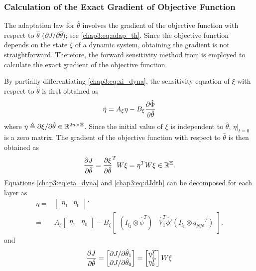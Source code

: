 \subsubsection{Calculation of the Exact Gradient of Objective Function}

The adaptation law for $\hat\theta$ involves the gradient of the objective function with respect to $\hat\theta$ (\ie ${\partial J/\partial \hat\theta}$); see \eqref{chap3:eq:adap_th}. Since the objective function depends on the state $\xi$ of a dynamic system, obtaining the gradient is not straightforward. Therefore, the forward sensitivity method from \cite{RN49} is employed to calculate the exact gradient of the objective function. 

By partially differentiating \eqref{chap3:eq:xi_dyna}, the sensitivity equation of $\xi$ with respect to $\hat\theta$ is first obtained as
\begin{equation}
    \dot\eta = A_\xi\eta - B_\xi{\partial\hat\Phi\over\partial\hat\theta}
    \label{chap3:eq:eta_dyna}
\end{equation}
where $\eta \triangleq \partial \xi/\partial \hat\theta\in\mathbb{R}^{2n\times \Xi}$.
Since the initial value of $\xi$ is independent to $\hat\theta$, $\eta\vert_{t=0}$ is a zero matrix. 
The gradient of the objective function with respect to $\hat\theta$ is then obtained as 
\begin{equation}
   {\partial J\over\partial \hat\theta} =  {\partial \xi\over \partial \hat\theta}^T  W\xi=\eta^T  W\xi\in\mathbb{R}^\Xi.
   \label{chap3:eq:dJdth}
\end{equation}
Equations \eqref{chap3:eq:eta_dyna} and \eqref{chap3:eq:dJdth} can be decomposed for each layer as 
\begin{equation}
  \begin{aligned}
    \dot\eta =&
    \begin{bmatrix}
        \eta_1&\eta_0
    \end{bmatrix}'
    \\
    =&A_\xi
    \begin{bmatrix}
        \eta_1&\eta_0
    \end{bmatrix}
    -B_\xi
    \begin{bmatrix}
        (I_{l_2}\otimes \hat\phi^T)&\hat V_1^T\hat\phi'(I_{l_1}\otimes {q_{NN}}^T)
    \end{bmatrix}
    .
  \end{aligned}
  \label{chap3:eq:eta_dyna_decomp}
\end{equation}
and
\begin{equation}
    {\partial J\over\partial\hat\theta}
    =
    \begin{bmatrix}
        \partial J/\partial\hat\theta_1\\\partial J/\partial\hat\theta_0\\
    \end{bmatrix}    =
    \begin{bmatrix}
        \eta_1^T\\\eta_0^T\\
    \end{bmatrix}
    W
    \xi
\end{equation}
